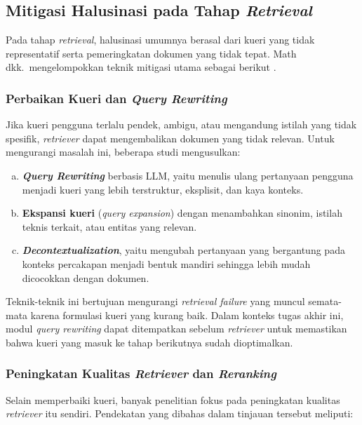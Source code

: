 \subsection{Mitigasi Halusinasi pada Tahap \textit{Retrieval}}
\label{subsec:retrieval-mitigation}

Pada tahap \textit{retrieval}, halusinasi umumnya berasal dari kueri yang tidak representatif serta pemeringkatan dokumen yang tidak tepat. Math dkk.\ mengelompokkan teknik mitigasi utama sebagai berikut \parencite{math2024hallucination}.

\subsubsection{Perbaikan Kueri dan \textit{Query Rewriting}}

Jika kueri pengguna terlalu pendek, ambigu, atau mengandung istilah yang tidak spesifik, \textit{retriever} dapat mengembalikan dokumen yang tidak relevan. Untuk mengurangi masalah ini, beberapa studi mengusulkan:

\begin{enumerate}[a.]
  \item \textbf{\textit{Query Rewriting}} berbasis LLM, yaitu menulis ulang pertanyaan pengguna menjadi kueri yang lebih terstruktur, eksplisit, dan kaya konteks.
  \item \textbf{Ekspansi kueri} (\textit{query expansion}) dengan menambahkan sinonim, istilah teknis terkait, atau entitas yang relevan.
  \item \textbf{\textit{Decontextualization}}, yaitu mengubah pertanyaan yang bergantung pada konteks percakapan menjadi bentuk mandiri sehingga lebih mudah dicocokkan dengan dokumen.
\end{enumerate}

Teknik-teknik ini bertujuan mengurangi \textit{retrieval failure} yang muncul semata-mata karena formulasi kueri yang kurang baik. Dalam konteks tugas akhir ini, modul \textit{query rewriting} dapat ditempatkan sebelum \textit{retriever} untuk memastikan bahwa kueri yang masuk ke tahap berikutnya sudah dioptimalkan.

\subsubsection{Peningkatan Kualitas \textit{Retriever} dan \textit{Reranking}}

Selain memperbaiki kueri, banyak penelitian fokus pada peningkatan kualitas \textit{retriever} itu sendiri. Pendekatan yang dibahas dalam tinjauan tersebut meliputi:

